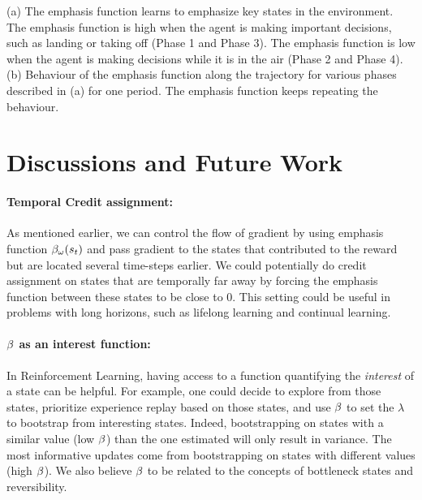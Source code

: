 (a) The emphasis function learns to emphasize key states in the environment. The emphasis function is high when the agent is making important decisions, such as landing or taking off (Phase 1 and Phase 3). The emphasis function is low when the agent is making decisions while it is in the air (Phase 2 and Phase 4). (b) Behaviour of the emphasis function along the trajectory for various phases described in (a) for one period. The emphasis function keeps repeating the behaviour.
\section{Discussions and Future Work}
\paragraph{Temporal Credit assignment:} As mentioned earlier, we can control the flow of gradient by using emphasis function $\beta_{\omega}(s_t)$ and pass gradient to the states that contributed to the reward but are located several time-steps earlier. We could potentially do credit assignment on states that are temporally far away by forcing the emphasis function between these states to be close to $0$. This setting could be useful in problems with long horizons, such as lifelong learning and continual learning.

\paragraph{$\beta$ as an interest function:}  In Reinforcement Learning, having access to a function quantifying the \emph{interest} \cite{mahmood2015emphatic} of a state can be helpful. For example, one could decide to explore from those states, prioritize experience replay based on those states, and use $\beta$ to set the $\lambda$ to bootstrap from interesting states. Indeed, bootstrapping on states with a similar value (low $\beta$) than the one estimated will only result in variance. The most informative updates come from bootstrapping on states with different values (high $\beta$). We also believe $\beta$ to be related to the concepts of bottleneck states \cite{tishby2011information} and reversibility.
